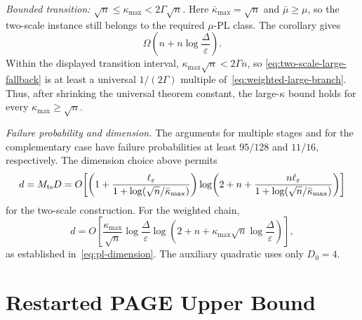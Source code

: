 \documentclass{article}
\theoremstyle{definition}
\begin{document}
\emph{Bounded transition: $\sqrt n\le\kappa_{\max}<2\Gamma\sqrt n$.}
Here $\bar\kappa_{\max}=\sqrt n$ and $\bar\mu\ge\mu$, so the two-scale
instance still belongs to the required $\mu$-PL class.  The corollary gives
\begin{equation}
 \Omega\!\left(n+n\log\frac{\Delta}{\varepsilon}\right).
 \label{eq:two-scale-large-fallback}
\end{equation}
Within the displayed transition interval,
$\kappa_{\max}\sqrt n<2\Gamma n$, so
\eqref{eq:two-scale-large-fallback} is at least a universal
$1/(2\Gamma)$ multiple of~\eqref{eq:weighted-large-branch}.  Thus, after
shrinking the universal theorem constant, the large-$\kappa$ bound
holds for every $\kappa_{\max}\ge\sqrt n$.

\emph{Failure probability and dimension.}
The arguments for multiple stages and for the complementary case have failure probabilities at least
$95/128$ and $11/16$, respectively.  The
dimension choice above permits
\begin{equation}
 d=M_{\rm ts}D
 =O\!\left[
 \left(1+
 \frac{\ell_\varepsilon}
 {1+\log(\sqrt n/\bar\kappa_{\max})}\right)
 \log\!\left(
 2+n+
 \frac{n\ell_\varepsilon}
 {1+\log(\sqrt n/\bar\kappa_{\max})}
 \right)
 \right]
 \label{eq:two-scale-dimension}
\end{equation}
for the two-scale construction.  For the weighted chain,
\begin{equation}
 d=O\!\left[
 \frac{\kappa_{\max}}{\sqrt n}
 \log\frac{\Delta}{\varepsilon}
 \log\!\left(
 2+n+\kappa_{\max}\sqrt n\log\frac{\Delta}{\varepsilon}
 \right)
 \right],
 \label{eq:restated-weighted-dimension-summary}
\end{equation}
as established in~\eqref{eq:pl-dimension}.  The auxiliary quadratic
uses only $D_0=4$.

\section{Restarted PAGE Upper Bound}
\label{app:page-upper}
\end{document}
